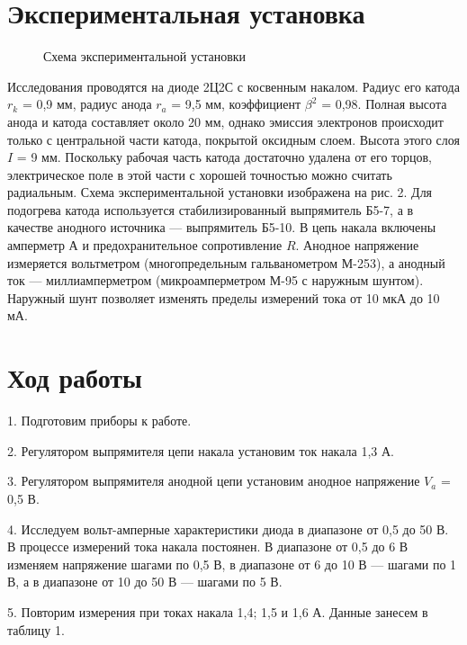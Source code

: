 \documentclass[a4paper,12pt]{article}
\begin{document}
\section{Экспериментальная установка}
\begin{figure}
	\centering
	\caption{Схема экспериментальной установки}
	\label{mah}
\end{figure}
\par Исследования проводятся на диоде 2Ц2С с косвенным накалом. Радиус его катода $r_k$ = 0,9 мм, радиус анода $r_a$ = 9,5 мм, коэффициент $\beta ^2$ = 0,98. Полная высота анода и катода составляет около 20 мм, однако эмиссия электронов происходит только с центральной части катода, покрытой оксидным слоем. Высота этого слоя $I$ = 9 мм. Поскольку рабочая часть катода достаточно удалена от его торцов, электрическое поле в этой части с хорошей точностью можно считать радиальным.
Схема экспериментальной установки изображена на рис. 2. Для подогрева катода используется стабилизированный выпрямитель Б5-7, а в качестве анодного источника — выпрямитель Б5-10. В цепь накала включены амперметр $А$ и предохранительное сопротивление $R$. Анодное напряжение измеряется вольтметром (многопредельным гальванометром М-253), а анодный ток — миллиамперметром (микроамперметром М-95 с наружным шунтом). Наружный шунт позволяет изменять пределы измерений тока от 10 мкА до 10 мА.

\section{Ход работы}

\par 1. Подготовим приборы к работе.
\par 2. Регулятором выпрямителя цепи накала установим ток накала 1,3 А.
\par 3. Регулятором выпрямителя анодной цепи установим анодное напряжение $V_a$ = 0,5 В.
\par 4. Исследуем вольт-амперные характеристики диода в диапазоне от 0,5 до 50 В. В процессе измерений тока накала постоянен. В диапазоне от 0,5 до 6 В изменяем напряжение шагами по 0,5 В, в диапазоне от 6 до 10 В — шагами по 1 В, а в диапазоне от 10 до 50 В — шагами по 5 В.
\par 5. Повторим измерения при токах накала 1,4; 1,5 и 1,6 А. Данные занесем в таблицу 1.
\end{document}
